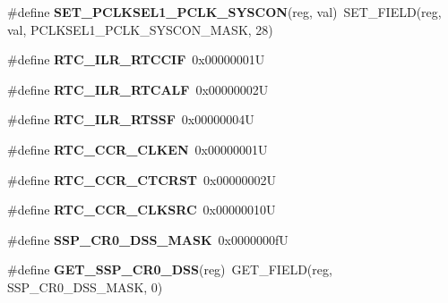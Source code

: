 \begin{DoxyCompactItemize}
\item 
\mbox{\label{group__lpc24xx__regs_ga16126bbc3cad6ebfe7e349775412b3d8}} 
\#define {\bfseries S\+E\+T\+\_\+\+P\+C\+L\+K\+S\+E\+L1\+\_\+\+P\+C\+L\+K\+\_\+\+S\+Y\+S\+C\+ON}(reg,  val)~S\+E\+T\+\_\+\+F\+I\+E\+LD(reg, val, P\+C\+L\+K\+S\+E\+L1\+\_\+\+P\+C\+L\+K\+\_\+\+S\+Y\+S\+C\+O\+N\+\_\+\+M\+A\+SK, 28)
\item 
\mbox{\label{group__lpc24xx__regs_ga7c5cee4d0b971b3fee6bc1dbd9f82ab9}} 
\#define {\bfseries R\+T\+C\+\_\+\+I\+L\+R\+\_\+\+R\+T\+C\+C\+IF}~0x00000001U
\item 
\mbox{\label{group__lpc24xx__regs_ga2a34b4f26d47e322a364e3a9d98d3957}} 
\#define {\bfseries R\+T\+C\+\_\+\+I\+L\+R\+\_\+\+R\+T\+C\+A\+LF}~0x00000002U
\item 
\mbox{\label{group__lpc24xx__regs_ga67d604d562df158040a5f0110b4a9824}} 
\#define {\bfseries R\+T\+C\+\_\+\+I\+L\+R\+\_\+\+R\+T\+S\+SF}~0x00000004U
\item 
\mbox{\label{group__lpc24xx__regs_gad08af035635f5acd7931cb982f95e771}} 
\#define {\bfseries R\+T\+C\+\_\+\+C\+C\+R\+\_\+\+C\+L\+K\+EN}~0x00000001U
\item 
\mbox{\label{group__lpc24xx__regs_ga70900054432c82dad7d63d4598502923}} 
\#define {\bfseries R\+T\+C\+\_\+\+C\+C\+R\+\_\+\+C\+T\+C\+R\+ST}~0x00000002U
\item 
\mbox{\label{group__lpc24xx__regs_gaf065a95a6fa92ff8482884a10a17e0a9}} 
\#define {\bfseries R\+T\+C\+\_\+\+C\+C\+R\+\_\+\+C\+L\+K\+S\+RC}~0x00000010U
\item 
\mbox{\label{group__lpc24xx__regs_ga29b5f0849b8a2ecb6207048c05a66d9d}} 
\#define {\bfseries S\+S\+P\+\_\+\+C\+R0\+\_\+\+D\+S\+S\+\_\+\+M\+A\+SK}~0x0000000fU
\item 
\mbox{\label{group__lpc24xx__regs_ga74f3aae4c8d2cb63381f527aae3344f2}} 
\#define {\bfseries G\+E\+T\+\_\+\+S\+S\+P\+\_\+\+C\+R0\+\_\+\+D\+SS}(reg)~G\+E\+T\+\_\+\+F\+I\+E\+LD(reg, S\+S\+P\+\_\+\+C\+R0\+\_\+\+D\+S\+S\+\_\+\+M\+A\+SK, 0)

\end{DoxyCompactItemize}

